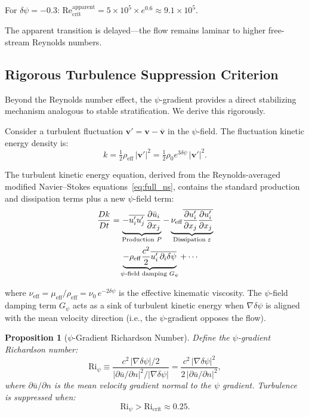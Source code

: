 \documentclass[12pt,twocolumn]{article}
\newcommand{\Reff}{\mathrm{eff}}
\newcommand{\Rey}{\mathrm{Re}}
\newcommand{\vvec}{\mathbf{v}}
\newcommand{\dpsi}{\delta\psi}
\newcommand{\half}{\tfrac{1}{2}}
\newtheorem{proposition}{Proposition}
\begin{document}
For $\dpsi = -0.3$:
$\Rey_\mathrm{crit}^\mathrm{apparent} = 5\times10^5\times e^{0.6}
\approx 9.1\times10^5$.

The apparent transition is delayed---the flow remains laminar to higher
free-stream Reynolds numbers.

\subsection{Rigorous Turbulence Suppression Criterion}
\label{sec:turb_suppress}

Beyond the Reynolds number effect, the $\psi$-gradient provides a direct
stabilizing mechanism analogous to stable stratification. We derive this
rigorously.

Consider a turbulent fluctuation $\vvec' = \vvec - \overline{\vvec}$ in
the $\psi$-field. The fluctuation kinetic energy density is:
\begin{equation}
k = \half\rho_\Reff\,|\vvec'|^2 = \half\rho_0 e^{3\dpsi}\,|\vvec'|^2.
\end{equation}

The turbulent kinetic energy equation, derived from the Reynolds-averaged
modified Navier--Stokes equations~\eqref{eq:full_ns}, contains the standard
production and dissipation terms plus a new $\psi$-field term:
\begin{align}
\frac{Dk}{Dt} &= \underbrace{-\overline{u'_i u'_j}\,\frac{\partial
\bar{u}_i}{\partial x_j}}_{\text{Production }P}
- \underbrace{\nu_\Reff\overline{\frac{\partial u'_i}{\partial x_j}
\frac{\partial u'_i}{\partial x_j}}}_{\text{Dissipation }\varepsilon}
\notag\\
&\quad\underbrace{- \rho_\Reff\frac{c^2}{2}
\overline{u'_i\,\partial_i\dpsi}}_{\text{$\psi$-field damping }G_\psi}
+ \cdots
\label{eq:tke}
\end{align}

where $\nu_\Reff = \mu_\Reff/\rho_\Reff = \nu_0\,e^{-2\dpsi}$ is the
effective kinematic viscosity. The $\psi$-field damping term $G_\psi$ acts
as a sink of turbulent kinetic energy when $\nabla\dpsi$ is aligned with
the mean velocity direction (i.e., the $\psi$-gradient opposes the flow).

\begin{proposition}[$\psi$-Gradient Richardson Number]
\label{prop:richardson}
Define the $\psi$-gradient Richardson number:
\begin{equation}
\mathrm{Ri}_\psi \equiv \frac{c^2\,|\nabla\dpsi|/2}
{|\partial\bar{u}/\partial n|^2/|\nabla\dpsi|}
= \frac{c^2\,|\nabla\dpsi|^2}{2\,|\partial\bar{u}/\partial n|^2},
\label{eq:ri_psi}
\end{equation}
where $\partial\bar{u}/\partial n$ is the mean velocity gradient normal
to the $\psi$ gradient. Turbulence is suppressed when:
\begin{equation}
\boxed{\mathrm{Ri}_\psi > \mathrm{Ri}_\mathrm{crit} \approx 0.25.}
\label{eq:ri_crit}
\end{equation}
\end{proposition}
\end{document}
